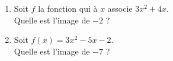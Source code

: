 \begin{multicols}{2}
\begin{enumerate}[itemsep=1.5em]
	\item \begin{minipage}[t]{\linewidth} Soit $f$ la fonction qui à $x$ associe $3x^2+4x$. \\ Quelle est l'image de $-2$ ?\\ \dtf \end{minipage}
	\item \begin{minipage}[t]{\linewidth} Soit $f(x)=3x^2-5x-2$. \\ Quelle est l'image de $-7$ ?\\ \dtf \end{minipage}
\end{enumerate}
\end{multicols}



